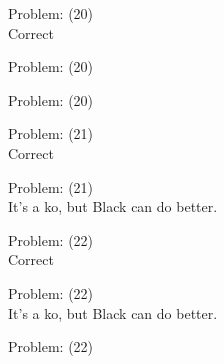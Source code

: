 \documentclass[11pt]{article}
\begin{document}
\begin{minipage}[t]{0.5\textwidth}
  {\centering
  
Problem: (20)\\
Correct\\
  }
\end{minipage}
\begin{minipage}[t]{0.5\textwidth}
  {\centering
  
Problem: (20)\\
  }
\end{minipage}
\begin{minipage}[t]{0.5\textwidth}
  {\centering
  
Problem: (20)\\
  }
\end{minipage}
\begin{minipage}[t]{0.5\textwidth}
  {\centering
  
Problem: (21)\\
Correct\\
  }
\end{minipage}
\begin{minipage}[t]{0.5\textwidth}
  {\centering
  
Problem: (21)\\
It's a ko, but Black can do better.\\
  }
\end{minipage}
\begin{minipage}[t]{0.5\textwidth}
  {\centering
  
Problem: (22)\\
Correct\\
  }
\end{minipage}
\begin{minipage}[t]{0.5\textwidth}
  {\centering
  
Problem: (22)\\
It's a ko, but Black can do better.\\
  }
\end{minipage}
\begin{minipage}[t]{0.5\textwidth}
  {\centering
  
Problem: (22)\\
  }
\end{minipage}
\end{document}
